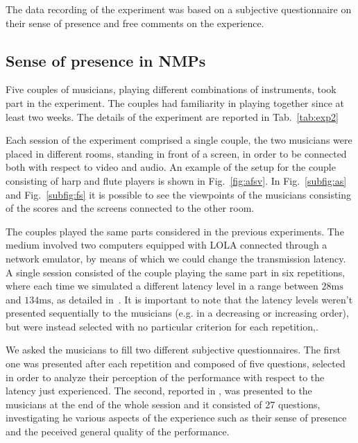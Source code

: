 The data recording of the experiment was based on a subjective questionnaire on their sense of presence and free comments on the experience. 





\subsection{Sense of presence in NMPs}
Five couples of musicians, playing different combinations of instruments, took part in the experiment. The couples had familiarity in playing together since at least two weeks. The details of the experiment are reported in Tab.~\ref{tab:exp2}

Each session of the experiment comprised a single couple, the two musicians were placed in different rooms, standing in front of a screen, in order to be connected both with respect to video and audio. An example of the setup for the couple consisting of harp and flute players is shown in Fig.~\ref{fig:afsv}. In Fig.~\ref{subfig:as} and Fig.~\ref{subfig:fs} it is possible to see the viewpoints of the musicians consisting of the scores and the screens connected to the other room. 

The couples played the same parts considered in the previous experiments. The medium involved two computers equipped with LOLA connected through a network emulator, by means of which we could change the transmission latency. A single session consisted of the couple playing the same part in six repetitions, where each time we simulated a different latency level in a range between $28\mathrm{ms}$ and $134\mathrm{ms}$, as detailed in~\cite{CIM2018}. It is important to note that the latency levels weren't presented sequentially to the musicians (e.g. in a decreasing or increasing order), but were instead selected with no particular criterion for each repetition,.

We asked the musicians to fill two different subjective questionnaires. The first one was presented after each repetition and composed of five questions, selected in order to analyze their perception of the performance with respect to the latency just experienced. The second, reported in \cite{CIM2018}, was presented to the musicians at the end of the whole session and it consisted of 27 questions, investigating he various aspects of the experience such as their sense of presence and the peceived general quality of the performance.


